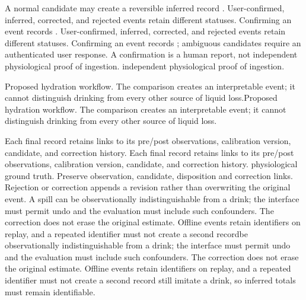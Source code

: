 \documentclass[conference]{IEEEtran}
\providecommand{\DIFadd}[1]{{\protect\color{blue} \sf #1}} %
\providecommand{\DIFdel}[1]{{\protect\color{red} \ifmmode #1\else\scriptsize #1\fi}} %
\providecommand{\DIFaddbegin}{} %
\providecommand{\DIFaddend}{} %
\providecommand{\DIFdelbegin}{} %
\providecommand{\DIFdelend}{} %
\providecommand{\DIFdelFL}[1]{\DIFdel{#1}} %
\begin{document}
\DIFadd{A }\DIFaddend normal candidate may create a reversible inferred record\DIFdelbegin \DIFdel{. User-confirmed, inferred, corrected, and rejected events retain different statuses. Confirming an event records }\DIFdelend \DIFaddbegin \DIFadd{; ambiguous candidates require an authenticated user response. A confirmation is }\DIFaddend a human report, not \DIFdelbegin \DIFdel{independent physiological proof of ingestion. }%

{%
\DIFdelFL{Proposed hydration workflow. The comparison creates an interpretable event; it cannot distinguish drinking from every other source of liquid loss.}}%

\DIFdel{Each final record retains links to its pre/post observations, calibration version, candidate, and correction history. }\DIFdelend \DIFaddbegin \DIFadd{physiological ground truth. Preserve observation, candidate, disposition and correction links. Rejection or correction appends a revision rather than overwriting the original event. }\DIFaddend A spill can \DIFdelbegin \DIFdel{be observationally indistinguishable from a drink; the interface must permit undo and the evaluation must include such confounders. The correction does not erase the original estimate. Offline events retain identifiers on replay, and a repeated identifier must not create a second record}\DIFdelend \DIFaddbegin \DIFadd{still imitate a drink, so inferred totals must remain identifiable}\DIFaddend .
\end{document}

